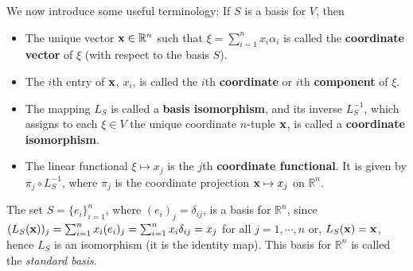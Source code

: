 \documentclass[12pt,letterpaper,reqno]{article}
\numberwithin{equation}{section}
\newcommand{\ti}[1]{\textit{#1}}
\begin{document}
We now introduce some useful terminology: If $S$ is a basis for $V$, then 
	\begin{itemize}
		\item The unique vector ${\bf x} \in \mathbb{R}^n$ such that $\xi=\sum_{i=1}^nx_i\alpha_i$ is called the {\bf coordinate vector} of $\xi$ (with respect to the basis $S$).
		\item The $i$th entry of ${\bf x}$, $x_i$, is called the $i$th {\bf coordinate} or $i$th {\bf component} of $\xi$.
		\item The mapping $L_S$ is called a {\bf basis isomorphism}, and its inverse $L_S^{-1}$, which assigns to each $\xi \in V$ the unique coordinate $n$-tuple ${\bf x}$, is called a {\bf coordinate isomorphism}.
		\item The linear functional $\xi \mapsto x_j$ is the $j$th {\bf coordinate functional}. It is given by $\pi_j \circ L_S^{-1}$, where $\pi_j$ is the coordinate projection ${\bf x} \mapsto x_j$ on $\mathbb{R}^n$.
	\end{itemize}

\begin{example}
The set $S=\{e_i\}_{i=1}^n$, where $(e_i)_j=\delta_{ij}$, is a basis for $\mathbb{R}^n$, since 
$(L_S({\bf x}))_j=\sum_{i=1}^nx_i(e_{i})_j=\sum_{i=1}^nx_i \delta_{ij}=x_j$ for all $j=1,\cdots,n$ or, $L_S({\bf x})={\bf x}$, hence $L_S$ is an isomorphism (it is the identity map). This basis for $\mathbb{R}^n$ is called the \ti{standard basis}. 
\end{example}
\end{document}
